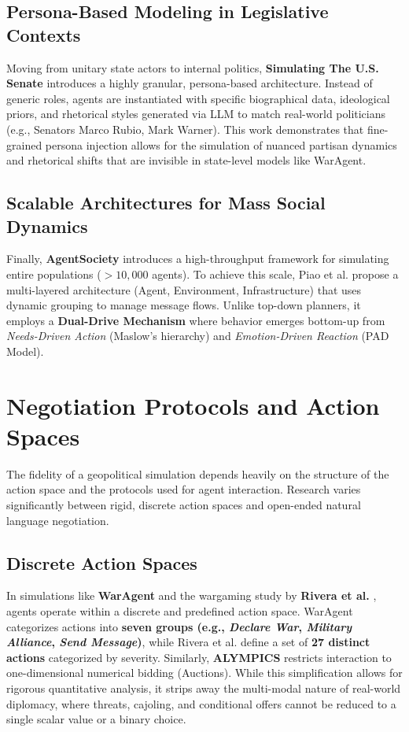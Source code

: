 \subsection{Persona-Based Modeling in Legislative Contexts}
Moving from unitary state actors to internal politics, \textbf{Simulating The U.S. Senate} \cite{baker2024simulating} introduces a highly granular, persona-based architecture. Instead of generic roles, agents are instantiated with specific biographical data, ideological priors, and rhetorical styles generated via LLM to match real-world politicians (e.g., Senators Marco Rubio, Mark Warner). This work demonstrates that fine-grained persona injection allows for the simulation of nuanced partisan dynamics and rhetorical shifts that are invisible in state-level models like WarAgent.

\subsection{Scalable Architectures for Mass Social Dynamics}
Finally, \textbf{AgentSociety} \cite{piao2025agentsociety} introduces a high-throughput framework for simulating entire populations ($>10,000$ agents). To achieve this scale, Piao et al. propose a multi-layered architecture (Agent, Environment, Infrastructure) that uses dynamic grouping to manage message flows. Unlike top-down planners, it employs a \textbf{Dual-Drive Mechanism} where behavior emerges bottom-up from \textit{Needs-Driven Action} (Maslow's hierarchy) and \textit{Emotion-Driven Reaction} (PAD Model).

\section{Negotiation Protocols and Action Spaces}
\label{sec:negotiation_protocols}

The fidelity of a geopolitical simulation depends heavily on the structure of the action space and the protocols used for agent interaction. Research varies significantly between rigid, discrete action spaces and open-ended natural language negotiation.

\subsection{Discrete Action Spaces}
In simulations like \textbf{WarAgent} and the wargaming study by \textbf{Rivera et al.} \cite{rivera2024escalation}, agents operate within a discrete and predefined action space. WarAgent categorizes actions into \textbf{seven groups (e.g., \textit{Declare War}, \textit{Military Alliance}, \textit{Send Message})}, while Rivera et al. define a set of \textbf{27 distinct actions} categorized by severity.
Similarly, \textbf{ALYMPICS} restricts interaction to one-dimensional numerical bidding (Auctions). While this simplification allows for rigorous quantitative analysis, it strips away the multi-modal nature of real-world diplomacy, where threats, cajoling, and conditional offers cannot be reduced to a single scalar value or a binary choice.

